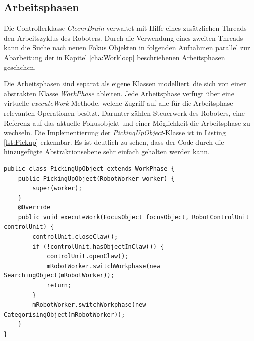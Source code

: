 \subsection{Arbeitsphasen}

Die Controllerklasse \textit{CleenrBrain} verwaltet mit Hilfe eines zusätzlichen Threads den Arbeitszyklus des Roboters. Durch die Verwendung eines zweiten Threads kann die Suche nach neuen Fokus Objekten in folgenden Aufnahmen parallel zur Abarbeitung der in Kapitel \ref{cha:Workloop} beschriebenen Arbeitsphasen geschehen. 

Die Arbeitsphasen sind separat als eigene Klassen modelliert, die sich von einer abstrakten Klasse \textit{WorkPhase} ableiten. Jede Arbeitsphase verfügt über eine virtuelle \textit{executeWork}-Methode, welche Zugriff auf alle für die Arbeitsphase relevanten Operationen besitzt. Darunter zählen Steuerwerk des Roboters, eine Referenz auf das aktuelle Fokusobjekt und einer Möglichkeit die Arbeitsphase zu wechseln. Die Implementierung der \textit{PickingUpObject}-Klasse ist in Listing \ref{lst:Pickup} erkennbar. Es ist deutlich zu sehen, dass der Code durch die hinzugefügte Abstraktionsebene sehr einfach gehalten werden kann.

\begin{lstlisting}[caption={Implementierung der Arbeitsphase \glqq Gegenstand aufnehmen\grqq }, label=lst:Pickup]
public class PickingUpObject extends WorkPhase {
    public PickingUpObject(RobotWorker worker) {
        super(worker);
    }
    @Override
    public void executeWork(FocusObject focusObject, RobotControlUnit controlUnit) {
        controlUnit.closeClaw();
        if (!controlUnit.hasObjectInClaw()) {
            controlUnit.openClaw();
            mRobotWorker.switchWorkphase(new SearchingObject(mRobotWorker));
            return;
        }
        mRobotWorker.switchWorkphase(new CategorisingObject(mRobotWorker));
    }
}
\end{lstlisting}

